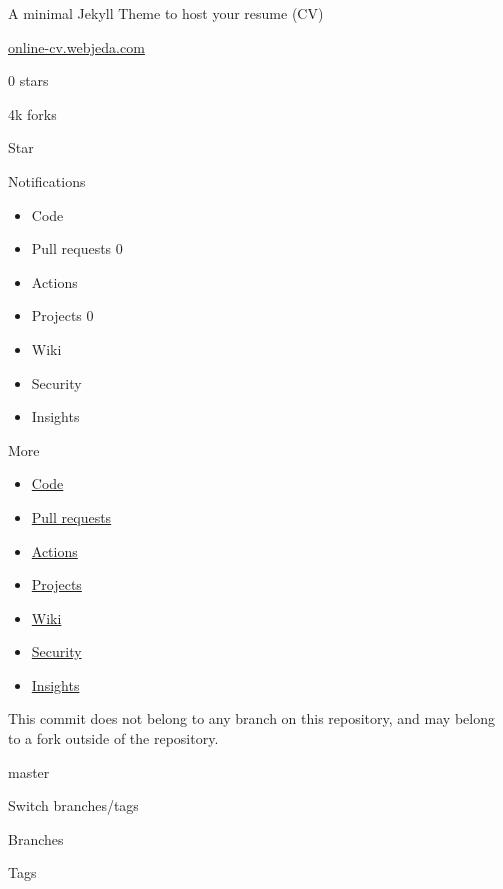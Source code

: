 \documentclass[english,]{article}
\providecommand{\tightlist}{%
  \setlength{\itemsep}{0pt}\setlength{\parskip}{0pt}}
\begin{document}
\hypertarget{responsive-meta-container}{}
A minimal Jekyll Theme to host your resume (CV)

{ \href{https://online-cv.webjeda.com}{online-cv.webjeda.com} }

{0} stars

{4k} forks

{ Star }

Notifications

\begin{itemize}
\tightlist
\item
  {Code} \protect\hypertarget{code-repo-tab-count}{}{}
\item
  {Pull requests}
  \protect\hypertarget{pull-requests-repo-tab-count}{}{0}
\item
  {Actions} \protect\hypertarget{actions-repo-tab-count}{}{}
\item
  {Projects} \protect\hypertarget{projects-repo-tab-count}{}{0}
\item
  {Wiki} \protect\hypertarget{wiki-repo-tab-count}{}{}
\item
  {Security}
\item
  {Insights} \protect\hypertarget{insights-repo-tab-count}{}{}
\end{itemize}

{More}

\begin{itemize}
\tightlist
\item
  \href{/alexpoulis/online-cv}{Code}
\item
  \href{/alexpoulis/online-cv/pulls}{Pull requests}
\item
  \href{/alexpoulis/online-cv/actions}{Actions}
\item
  \href{/alexpoulis/online-cv/projects?type=beta}{Projects}
\item
  \href{/alexpoulis/online-cv/wiki}{Wiki}
\item
  \href{/alexpoulis/online-cv/security}{Security}
\item
  \href{/alexpoulis/online-cv/pulse}{Insights}
\end{itemize}

\hypertarget{repo-content-pjax-container}{}
\hypertarget{spoof-warning}{}
This commit does not belong to any branch on this repository, and may
belong to a fork outside of the repository.

{master} {}

{Switch branches/tags}

Branches

Tags
\end{document}

